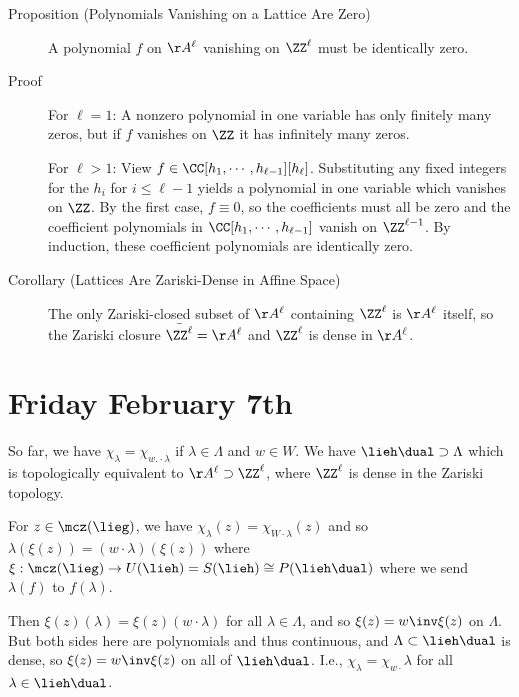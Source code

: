 \begin{description}
\item[Proposition (Polynomials Vanishing on a Lattice Are Zero)]
A polynomial \(f\) on \(\AA^\ell\) vanishing on \(\ZZ^\ell\) must be
identically zero.
\item[Proof]
For \(\ell = 1\): A nonzero polynomial in one variable has only finitely
many zeros, but if \(f\) vanishes on \(\ZZ\) it has infinitely many
zeros.

For \(\ell > 1\): View \(f\in \CC[h_1, \cdots, h_{\ell-1}][h_\ell]\).
Substituting any fixed integers for the \(h_i\) for \(i\leq \ell - 1\)
yields a polynomial in one variable which vanishes on \(\ZZ\). By the
first case, \(f \equiv 0\), so the coefficients must all be zero and the
coefficient polynomials in \(\CC[h_1, \cdots ,h_{\ell-1}]\) vanish on
\(\ZZ^{\ell-1}\). By induction, these coefficient polynomials are
identically zero.
\item[Corollary (Lattices Are Zariski-Dense in Affine Space)]
The only Zariski-closed subset of \(\AA^\ell\) containing \(\ZZ^\ell\)
is \(\AA^\ell\) itself, so the Zariski closure
\(\bar{\ZZ^\ell} = \AA^\ell\) and \(\ZZ^\ell\) is dense in \(\AA^\ell\).
\end{description}

\hypertarget{friday-february-7th}{%
\section{Friday February 7th}\label{friday-february-7th}}

So far, we have \(\chi_\lambda = \chi_{w.\cdot \lambda}\) if
\(\lambda \in \Lambda\) and \(w\in W\). We have
\(\lieh\dual \supset \Lambda\) which is topologically equivalent to
\(\AA^\ell \supset \ZZ^\ell\), where \(\ZZ^\ell\) is dense in the
Zariski topology.

For \(z\in \mcz(\lieg)\), we have
\(\chi_\lambda(z) = \chi_{W\cdot \lambda} (z)\) and so
\(\lambda(\xi(z)) = (w\cdot \lambda )(\xi(z))\) where
\(\xi: \mcz(\lieg) \to U(\lieh) = S(\lieh) \cong P(\lieh\dual)\) where
we send \(\lambda(f)\) to \(f(\lambda)\).

Then \(\xi(z)(\lambda) = \xi(z)(w\cdot \lambda)\) for all
\(\lambda \in \Lambda\), and so \(\xi(z) = w\inv \xi(z)\) on
\(\Lambda\). But both sides here are polynomials and thus continuous,
and \(\Lambda \subset \lieh\dual\) is dense, so
\(\xi(z) = w\inv \xi(z)\) on all of \(\lieh\dual\). I.e.,
\(\chi_\lambda = \chi_{w\cdot } \lambda\) for all
\(\lambda \in \lieh\dual\).

